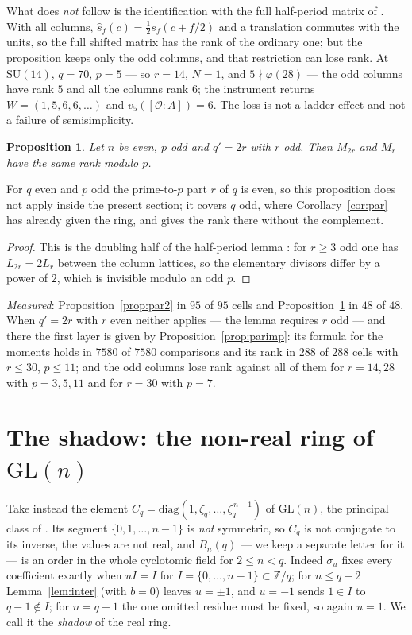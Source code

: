 \documentclass[11pt,a4paper]{article}
\newtheorem{proposition}[theorem]{Proposition}
\theoremstyle{definition}
\newcommand{\SU}{\mathrm{SU}}
\newcommand{\GL}{\mathrm{GL}}
\newcommand{\ZZ}{\mathbb{Z}}
\newcommand{\cO}{\mathcal{O}}
\newcommand{\medido}[1]{\emph{Measured}: #1}
\begin{document}
\noindent What does \emph{not} follow is the identification with the full half-period matrix of
\cite{Cond}. With all columns, $\widehat s_f(c)=\tfrac12 s_f(c+f/2)$ and a translation commutes
with the units, so the full shifted matrix has the rank of the ordinary one; but the proposition
keeps only the odd columns, and that restriction can lose rank. At $\SU(14)$, $q=70$, $p=5$ --- so
$r=14$, $N=1$, and $5\nmid\varphi(28)$ --- the odd columns have rank $5$ and all the columns rank
$6$; the instrument returns $W=(1,5,6,6,\dots)$ and $v_5([\cO:A])=6$. The loss is not a ladder
effect and not a failure of semisimplicity.

\begin{proposition}\label{prop:par1}
Let $n$ be even, $p$ odd and $q'=2r$ with $r$ odd. Then $M_{2r}$ and $M_r$ have the same rank
modulo $p$.
\end{proposition}

\noindent For $q$ even and $p$ odd the prime-to-$p$ part $r$ of $q$ is even, so this
proposition does not apply inside the present section; it covers $q$ odd, where
Corollary~\ref{cor:par} has already given the ring, and gives the rank there without the
complement.

\begin{proof}
This is the doubling half of the half-period lemma \cite[Lem.~14]{Cond}: for $r\ge3$ odd one has
$L_{2r}=2L_r$ between the column lattices, so the elementary divisors differ by a power of $2$,
which is invisible modulo an odd $p$.
\end{proof}

\medido{Proposition~\ref{prop:par2} in $95$ of $95$ cells and Proposition~\ref{prop:par1} in $48$
of $48$. When $q'=2r$ with $r$ even neither applies --- the lemma requires $r$ odd --- and there the
first layer is given by Proposition~\ref{prop:parimp}: its formula for the moments holds in $7580$ of
$7580$ comparisons and its rank in $288$ of $288$ cells with $r\le30$, $p\le11$; and the odd
columns lose rank against all of them for $r=14,28$ with $p=3,5,11$ and for $r=30$ with $p=7$.}

\section{The shadow: the non-real ring of \texorpdfstring{$\GL(n)$}{GL(n)}}\label{sec:sombra}

Take instead the element $C_q=\mathrm{diag}(1,\zeta_q,\dots,\zeta_q^{\,n-1})$ of $\GL(n)$, the
principal class of \cite{NPP}. Its segment $\{0,1,\dots,n-1\}$ is \emph{not} symmetric, so $C_q$ is
not conjugate to its inverse, the values are not real, and $B_n(q)$ --- we keep a separate letter
for it --- is an order in the whole cyclotomic field for $2\le n<q$. Indeed $\sigma_u$ fixes every
coefficient exactly when $uI=I$ for $I=\{0,\dots,n-1\}\subset\ZZ/q$; for $n\le q-2$
Lemma~\ref{lem:inter} (with $b=0$) leaves $u=\pm1$, and $u=-1$ sends $1\in I$ to $q-1\notin I$; for
$n=q-1$ the one omitted residue must be fixed, so again $u=1$. We call it the \emph{shadow} of the real ring.
\end{document}

